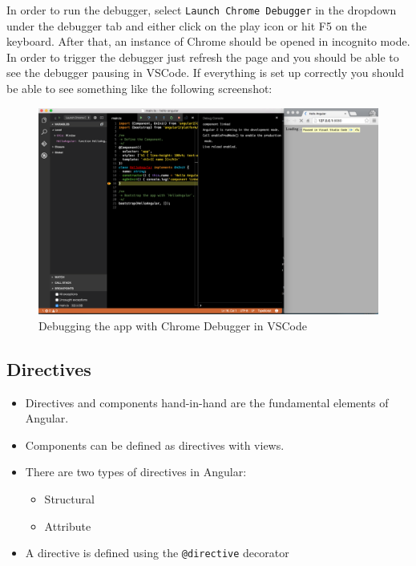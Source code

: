 \documentclass[12pt,]{article}
\providecommand{\tightlist}{%
  \setlength{\itemsep}{0pt}\setlength{\parskip}{0pt}}
\begin{document}
In order to run the debugger, select \texttt{Launch\ Chrome\ Debugger}
in the dropdown under the debugger tab and either click on the play icon
or hit F5 on the keyboard. After that, an instance of Chrome should be
opened in incognito mode. In order to trigger the debugger just refresh
the page and you should be able to see the debugger pausing in VSCode.
If everything is set up correctly you should be able to see something
like the following screenshot:

\begin{figure}[htbp]
\centering
\includegraphics{images/run-debugger.png}
\caption{Debugging the app with Chrome Debugger in VSCode}
\end{figure}

\subsection{Directives}\label{directives}

\begin{itemize}
\tightlist
\item
  Directives and components hand-in-hand are the fundamental elements of
  Angular.
\item
  Components can be defined as directives with views.
\item
  There are two types of directives in Angular:

  \begin{itemize}
  \tightlist
  \item
    Structural
  \item
    Attribute
  \end{itemize}
\item
  A directive is defined using the \texttt{@directive} decorator
\end{itemize}
\end{document}
